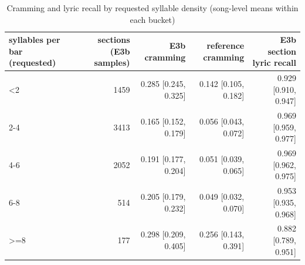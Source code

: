\begin{table}[t]
\centering
\small
\begin{tabular}{lrrrr}
\toprule
syllables per bar (requested) & sections (E3b samples) & E3b cramming & reference cramming & E3b section lyric recall \\
\midrule
<2 & 1459 & 0.285 [0.245, 0.325] & 0.142 [0.105, 0.182] & 0.929 [0.910, 0.947] \\
2-4 & 3413 & 0.165 [0.152, 0.179] & 0.056 [0.043, 0.072] & 0.969 [0.959, 0.977] \\
4-6 & 2052 & 0.191 [0.177, 0.204] & 0.051 [0.039, 0.065] & 0.969 [0.962, 0.975] \\
6-8 & 514 & 0.205 [0.179, 0.232] & 0.049 [0.032, 0.070] & 0.953 [0.935, 0.968] \\
>=8 & 177 & 0.298 [0.209, 0.405] & 0.256 [0.143, 0.391] & 0.882 [0.789, 0.951] \\
\bottomrule
\end{tabular}
\caption{Cramming and lyric recall by requested syllable density (song-level means within each bucket)}
\label{tab:lyric_pressure}
\end{table}
